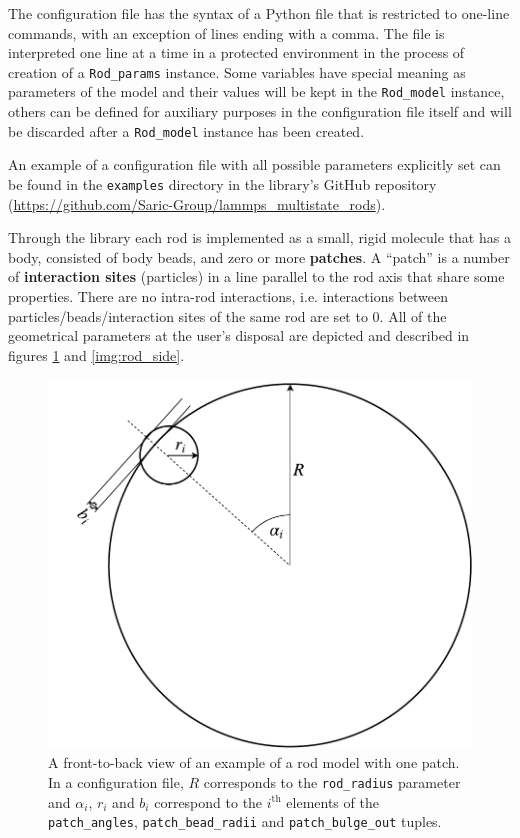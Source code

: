 \documentclass[a4paper]{article}
\begin{document}
\vspace{1em}

The configuration file has the syntax of a Python file that is restricted to one-line commands, with an
exception of lines ending with a comma. The file is interpreted one line at a time in a protected environment
in the process of creation of a \texttt{Rod\_params} instance.
Some variables have special meaning as parameters of the model and their values will be kept in the
\texttt{Rod\_model} instance, others can be defined for auxiliary purposes in the configuration file itself
and will be discarded after a \texttt{Rod\_model} instance has been created.

An example of a configuration file with all possible parameters explicitly set can be found in the
\texttt{examples} directory in the library's GitHub repository
(\href{https://github.com/Saric-Group/lammps_multistate_rods}{https://github.com/Saric-Group/lammps\_multistate\_rods}).

\vspace{1em}

Through the library each rod is implemented as a small, rigid molecule that has a body, consisted of body
beads, and zero or more \textbf{patches}. A ``patch'' is a number of \textbf{interaction sites}
(particles) in a line parallel to the rod axis that share some properties. There are no intra-rod
interactions, i.e. interactions between particles/beads/interaction sites of the same rod are set to 0.
All of the geometrical parameters at the user's disposal are depicted and described in figures
\ref{img:rod_front} and \ref{img:rod_side}.

\begin{figure}[!h]
\centering
\includegraphics[width=0.38\linewidth]{rod_model-front_view.pdf}
\captionsetup{width=.7\linewidth}
\caption{A front-to-back view of an example of a rod model with one patch. In a configuration file, $R$
corresponds to the \texttt{rod\_radius} parameter and $\alpha_i$, $r_i$ and $b_i$ correspond to the
$i^\text{th}$ elements of the \texttt{patch\_angles}, \texttt{patch\_bead\_radii} and
\texttt{patch\_bulge\_out} tuples.}
\label{img:rod_front}
\end{figure}
\end{document}
